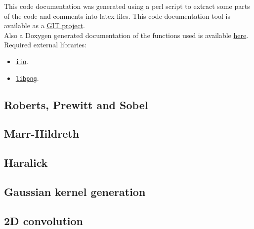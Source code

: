 \documentclass{ipol}
\numberwithin{equation}{section}
\numberwithin{table}{section}
\begin{document}
This code documentation was generated using a perl script to extract some parts of the 
code and comments into latex files. This code documentation tool is available as a \href{https://github.com/juan-cardelino/source_comment_extractor}{GIT project}. \\

Also a Doxygen generated documentation of the functions used is available \href{http://iie.fing.edu.uy/~haldos/ipol/red_v0.1}{here}. \\

Required external libraries: 
\begin{itemize}
	\item \href{http://dev.ipol.im/git/coco/iio.git}{\texttt{iio}}.
	\item \href{http://www.libpng.org/}{\texttt{libpng}}. 
\end{itemize}

\subsection{Roberts, Prewitt and Sobel}


\subsection{Marr-Hildreth}
\label{app:marr-hildreth}


\subsection{Haralick}


\subsection{Gaussian kernel generation}


\subsection{2D convolution}


\clearpage



\end{document}
